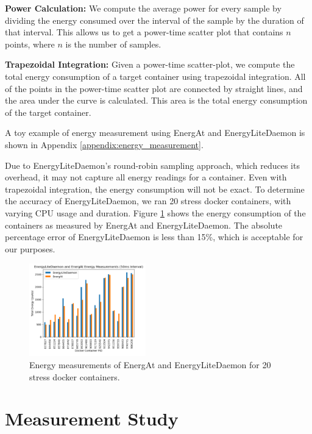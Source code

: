 \documentclass[times, 10pt,twocolumn]{article}
\begin{document}
\textbf{Power Calculation:} We compute the average power for every sample by dividing the energy consumed over the interval of the sample by the duration of that interval. This allows us to get a power-time scatter plot that contains $n$ points, where $n$ is the number of samples.

\textbf{Trapezoidal Integration:} Given a power-time scatter-plot, we compute the total energy consumption of a target container using trapezoidal integration. All of the points in the power-time scatter plot are connected by straight lines, and the area under the curve is calculated. This area is the total energy consumption of the target container. 

A toy example of energy measurement using EnergAt and EnergyLiteDaemon is shown in Appendix \ref{appendix:energy_measurement}.

Due to EnergyLiteDaemon's round-robin sampling approach, which reduces its overhead, it may not capture all energy readings for a container. Even with trapezoidal integration, the energy consumption will not be exact. To determine the accuracy of EnergyLiteDaemon, we ran 20 stress docker containers, with varying CPU usage and duration. Figure \ref{fig:EnergyLiteDaemon_Efficacy} shows the energy consumption of the containers as measured by EnergAt and EnergyLiteDaemon. The absolute percentage error of EnergyLiteDaemon is less than 15\%, which is acceptable for our purposes.

\begin{figure}
   \centering
   \includegraphics[width=0.45\textwidth]{imgs/EnergyLiteDaemon_Efficacy.png}
   \caption{Energy measurements of EnergAt and EnergyLiteDaemon for 20 stress docker containers.}
   \label{fig:EnergyLiteDaemon_Efficacy}
 \end{figure}

\section{Measurement Study}
\end{document}
